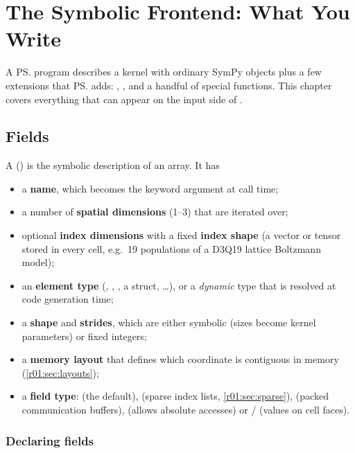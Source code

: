 \chapter{The Symbolic Frontend: What You Write}\label{r01:ch:symbolic-frontend}

A \ps{} program describes a kernel with ordinary SymPy objects plus a few extensions
that \ps{} adds: , ,  and a
handful of special functions. This chapter covers everything that can appear on the
input side of .

\section{Fields}\label{r01:sec:fields}

A  () is the symbolic description of an array.
It has
\begin{itemize}
  \item a \textbf{name}, which becomes the keyword argument at call time;
  \item a number of \textbf{spatial dimensions} (1--3) that are iterated over;
  \item optional \textbf{index dimensions} with a fixed \textbf{index shape} (a vector or
        tensor stored in every cell, e.g.\ 19 populations of a D3Q19 lattice Boltzmann
        model);
  \item an \textbf{element type} (, , , a
        struct, \dots), or a \emph{dynamic} type that is resolved at code generation
        time;
  \item a \textbf{shape} and \textbf{strides}, which are either symbolic (sizes become
        kernel parameters) or fixed integers;
  \item a \textbf{memory layout} that defines which coordinate is contiguous in memory
        (\cref{r01:sec:layouts});
  \item a \textbf{field type}:  (the default),  (sparse
        index lists, \cref{r01:sec:sparse}),  (packed communication buffers),
         (allows absolute accesses) or  /
         (values on cell faces).
\end{itemize}

\subsection{Declaring fields}

